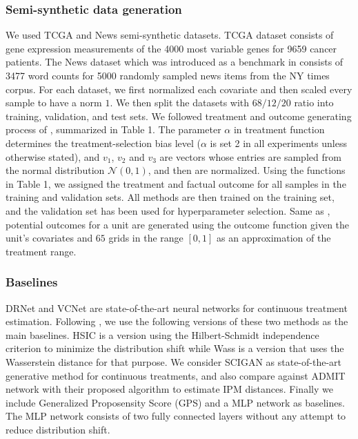 \documentclass[letterpaper]{article} %
\begin{document}
\subsubsection{Semi-synthetic data generation}
We used TCGA \cite{6c2aadb632ec445491a8f95490e23836} and News \cite{pmlr-v48-johansson16} semi-synthetic datasets. TCGA dataset consists of gene expression measurements of the 4000 most variable genes for 9659 cancer patients. The News dataset which was introduced as a benchmark in \cite{pmlr-v48-johansson16} consists of 3477 word counts for 5000 randomly sampled news items from the NY times corpus. For each dataset, we first normalized each covariate and then scaled every sample to have a norm $1$. We then split the datasets with $68/12/20$ ratio into training, validation, and test sets. We followed treatment and outcome generating process of \cite{bica2020estimating}, summarized in Table 1. The parameter $\alpha$ in treatment function determines the treatment-selection bias level ($\alpha$ is set 2 in all experiments unless otherwise stated), and $v_1$, $v_2$ and $v_3$ are  vectors whose entries are sampled from the normal distribution $\mathcal{N}(0, 1)$, and then are normalized. Using the functions in Table 1, we assigned the treatment and factual outcome for all samples in the training and validation sets. All methods are then trained on the training set, and the validation set has been used for hyperparameter selection. Same as \cite{bica2020estimating}, potential outcomes for a unit are generated using the outcome function given the unit's covariates and $65$ grids in the range $[0, 1]$ as an approximation of the treatment range. 
\subsubsection{Baselines}
DRNet \cite{Schwab_2020} and VCNet \cite{nie2021vcnet} are state-of-the-art neural networks for continuous treatment estimation. Following \cite{bellot2022generalization}, we use the following versions of these two methods as the main baselines. HSIC \cite{HSIC} is a version using the Hilbert-Schmidt independence criterion to minimize the distribution shift while Wass  \cite{Wasserstein} is a version that uses the Wasserstein distance for that purpose. We consider SCIGAN \cite{bica2020estimating} as state-of-the-art generative method for continuous treatments, and also compare against ADMIT \cite{wang2022generalization} network with their proposed algorithm to estimate IPM distances. 
Finally we include Generalized Proposensity Score (GPS) and a MLP network as baselines. The MLP network consists of two fully connected layers without any attempt to reduce distribution shift.
\end{document}
